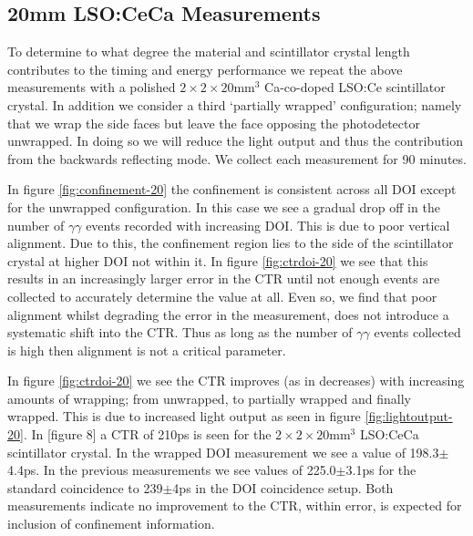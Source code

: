 \subsection{20mm LSO:CeCa Measurements}
To determine to what degree the material and scintillator crystal length contributes to the timing and energy performance we repeat the above measurements with a polished $2\times2\times20$mm$^3$ Ca-co-doped LSO:Ce scintillator crystal. In addition we consider a third `partially wrapped' configuration; namely that we wrap the side faces but leave the face opposing the photodetector unwrapped. In doing so we will reduce the light output and thus the contribution from the backwards reflecting mode. We collect each measurement for 90 minutes.

In figure \ref{fig:confinement-20} the confinement is consistent across all DOI except for the unwrapped configuration. In this case we see a gradual drop off in the number of $\gamma\gamma$ events recorded with increasing DOI. This is due to poor vertical alignment. Due to this, the confinement region lies to the side of the scintillator crystal at higher DOI not within it. In figure \ref{fig:ctrdoi-20} we see that this results in an increasingly larger error in the CTR until not enough events are collected to accurately determine the value at all. Even so, we find that poor alignment whilst degrading the error in the measurement, does not introduce a systematic shift into the CTR. Thus as long as the number of $\gamma\gamma$ events collected is high then alignment is not a critical parameter. 

In figure \ref{fig:ctrdoi-20} we see the CTR improves (as in decreases) with increasing amounts of wrapping; from unwrapped, to partially wrapped and finally wrapped. This is due to increased light output as seen in figure \ref{fig:lightoutput-20}. In [figure 8] \cite{r_Paganoni_Pauwels_et_al__2011} a CTR of 210ps is seen for the $2\times2\times20$mm$^3$ LSO:CeCa scintillator crystal. In the wrapped DOI measurement we see a value of 198.3$\pm$4.4ps. In the previous measurements we see values of 225.0$\pm$3.1ps for the standard coincidence to 239$\pm$4ps in the DOI coincidence setup. Both measurements indicate no improvement to the CTR, within error, is expected for inclusion of confinement information.